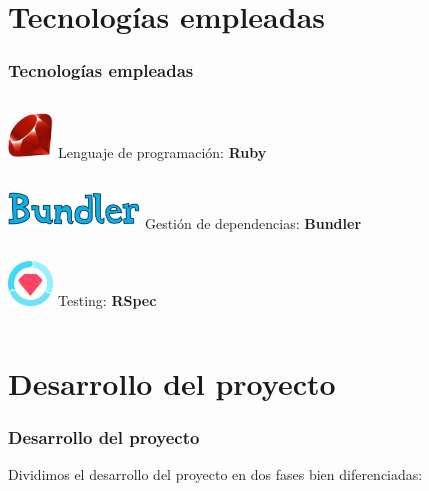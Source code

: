 \documentclass{beamer}
\begin{document}

\section{Tecnologías empleadas}
\begin{frame}[fragile]
  \frametitle{Tecnologías empleadas}
  \begin{columns}
       \centering
       \includegraphics[height=1.2cm, width=1.2cm]{img/ruby-logo.png}
        Lenguaje de programación: \textbf{Ruby}
  \end{columns}
  \bigskip

  \begin{columns}
       \centering
       \includegraphics[height=1cm, width=3.5cm]{img/bundler-logo.png}
        Gestión de dependencias: \textbf{Bundler}
  \end{columns}
  \bigskip

  \begin{columns}
       \centering
       \includegraphics[height=1.2cm, width=1.2cm]{img/rspec-logo.png}
        Testing: \textbf{RSpec}
  \end{columns}
\end{frame}

\section{Desarrollo del proyecto}
\begin{frame}
\frametitle{Desarrollo del proyecto}
  Dividimos el desarrollo del proyecto en dos fases bien diferenciadas:

\end{frame}
\end{document}
